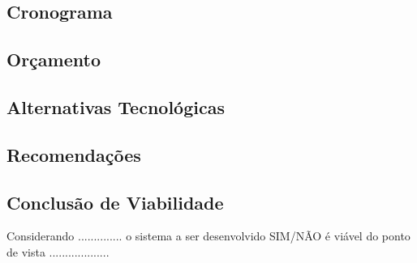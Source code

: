        \subsection{Cronograma }

       \subsection{Or\c{c}amento }

       \subsection{Alternativas Tecnol\'{o}gicas }

       \subsection{Recomenda\c{c}\~{o}es}

       \subsection{Conclus\~{a}o de Viabilidade}

       Considerando .............. o sistema a ser desenvolvido SIM/N\~{A}O \'{e} vi\'{a}vel do ponto de vista ...................
